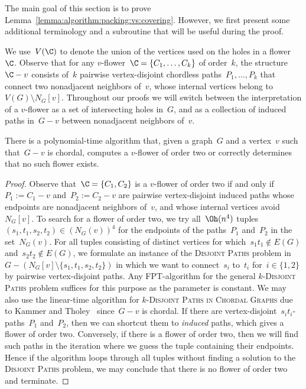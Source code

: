 The main goal of this section is to prove Lemma~\ref{lemma:algorithm:packing:vs:covering}. However, we first present some additional terminology and a subroutine that will be useful during the proof.

We use~$V(\C)$ to denote the union of the vertices used on the holes in a flower~$\C$. Observe that for any $v$-flower~$\C = \{C_1, \ldots, C_k\}$ of order~$k$, the structure~$\C-v$ consists of~$k$ pairwise vertex-disjoint chordless paths~$P_1, \ldots, P_k$ that connect two nonadjacent neighbors of~$v$, whose internal vertices belong to~$V(G) \setminus N_G[v]$. Throughout our proofs we will switch between the interpretation of a $v$-flower as a set of intersecting holes in~$G$, and as a collection of induced paths in~$G - v$ between nonadjacent neighbors of~$v$.

\begin{proposition} \label{proposition:twoflower}
There is a polynomial-time algorithm that, given a graph~$G$ and a vertex~$v$ such that~$G - v$ is chordal, computes a $v$-flower of order two or correctly determines that no such flower exists.
\end{proposition}
\begin{proof}
Observe that~$\C = \{C_1, C_2\}$ is a $v$-flower of order two if and only if~$P_1 := C_1 - v$ and~$P_2 := C_2 - v$ are pairwise vertex-disjoint induced paths whose endpoints are nonadjacent neighbors of~$v$, and whose internal vertices avoid~$N_G[v]$. To search for a flower of order two, we try all~$\Oh(n^4)$ tuples~$(s_1,t_1,s_2,t_2) \in (N_G(v))^4$ for the endpoints of the paths~$P_1$ and~$P_2$ in the set~$N_G(v)$. For all tuples consisting of distinct vertices for which~$s_1 t_1 \not \in E(G)$ and~$s_2 t_2 \not \in E(G)$, we formulate an instance of the \textsc{Disjoint Paths} problem in~$G-(N_G[v] \setminus \{s_1, t_1, s_2, t_2\})$ in which we want to connect~$s_i$ to~$t_i$ for~$i \in \{1,2\}$ by pairwise vertex-disjoint paths. Any FPT-algorithm for the general \textsc{$k$-Disjoint Paths} problem suffices for this purpose as the parameter is constant. We may also use the linear-time algorithm for \textsc{$k$-Disjoint Paths in Chordal Graphs} due to Kammer and Tholey~\cite{KammerT09} since~$G - v$ is chordal. If there are vertex-disjoint~$s_i t_i$-paths~$P_1$ and~$P_2$, then we can shortcut them to \emph{induced} paths, which gives a flower of order two. Conversely, if there is a flower of order two, then we will find such paths in the iteration where we guess the tuple containing their endpoints. Hence if the algorithm loops through all tuples without finding a solution to the \textsc{Disjoint Paths} problem, we may conclude that there is no flower of order two and terminate.
\end{proof}

